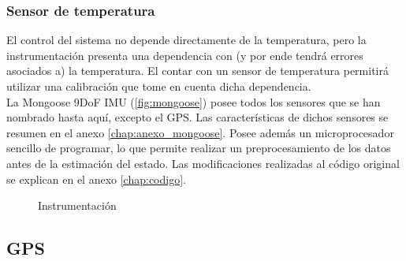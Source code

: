 \documentclass[main]{subfiles}
\begin{document}
\subsubsection{Sensor de temperatura}

El control del sistema no depende directamente de la temperatura, pero la instrumentaci\'on presenta una dependencia con (y por ende tendr\'a errores asociados a) la temperatura. El contar con un sensor de temperatura permitir\'a utilizar una calibraci\'on que tome en cuenta dicha dependencia.\\

La Mongoose 9DoF IMU (\ref{fig:mongoose}) posee todos los sensores que se han nombrado hasta aqu\'i, excepto el GPS. Las caracter\'isticas de dichos sensores se resumen en el anexo \ref{chap:anexo_mongoose}. Posee adem\'as un microprocesador sencillo de programar, lo que permite realizar un preprocesamiento de los datos antes de la estimaci\'on del estado. Las modificaciones realizadas al c\'odigo original se explican en el anexo \ref{chap:codigo}.

\begin{figure} 
  \vspace{-40pt}
  \centering
  \hspace{2cm}
  
  \caption{Instrumentaci\'on}
  \label{fig:intrumentacion}
\end{figure}

\subsection{GPS}
\end{document}

